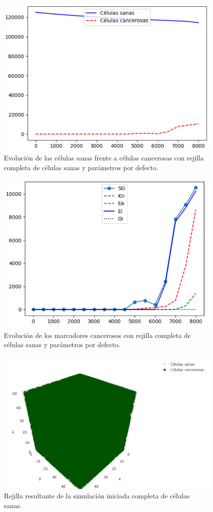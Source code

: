 \begin{figure}[h]
\centering
\includegraphics[scale=0.8]{figures/experiments/exp5/healthvscarcino}
\caption{Evolución de las células sanas frente a células cancerosas con rejilla completa de células sanas y parámetros por defecto.}
\end{figure}

\begin{figure}[h]
\centering
\includegraphics[scale=0.8]{figures/experiments/exp5/mutations}
\caption{Evolución de los marcadores cancerosos con rejilla completa de células sanas y parámetros por defecto.}
\end{figure}

\begin{figure}[h]
\centering
\includegraphics[scale=0.6]{figures/experiments/exp5/grid}
\caption{Rejilla resultante de la simulación iniciada completa de células sanas.}
\end{figure}
